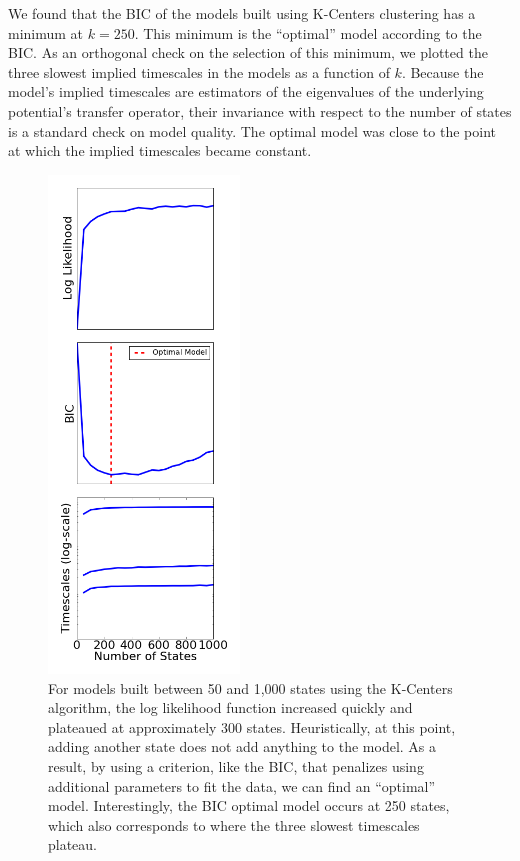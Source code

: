 \documentclass[twocolumn,floatfix,nofootinbib,aps]{revtex4-1}
\begin{document}
We found that the BIC of the models built using K-Centers clustering has a minimum at $k=250$. This minimum is the ``optimal'' model according to the BIC. As an orthogonal check on the selection of this minimum, we plotted the three slowest implied timescales in the models as a function of $k$. Because the model's implied timescales are estimators of the eigenvalues of the underlying potential's transfer operator, their invariance with respect to the number of states is a standard check on model quality. The optimal model was close to the point at which the implied timescales became constant. 

\begin{figure}
\includegraphics[width=2in]{figs/like_comp.png}
\caption{For models built between 50 and 1,000 states using the K-Centers algorithm, the log likelihood function increased quickly and plateaued at approximately 300 states. Heuristically, at this point, adding another state does not add anything to the model. As a result, by using a criterion, like the BIC, that penalizes using additional parameters to fit the data, we can find an ``optimal'' model. Interestingly, the BIC optimal model occurs at 250 states, which also corresponds to where the three slowest timescales plateau.}
\label{fig:like_kcenters}
\end{figure}
\end{document}
